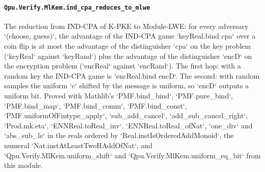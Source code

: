 \documentclass[11pt]{article}
\begin{document}
\paragraph{\texttt{Qpu.Verify.MlKem.ind\_cpa\_reduces\_to\_mlwe}}
The reduction from IND-CPA of K-PKE to Module-LWE: for every adversary `(choose, guess)`, the advantage of the IND-CPA game `keyReal.bind cpa` over a coin flip is at most the advantage of the distinguisher `cpa` on the key problem (`keyReal` against `keyRand`) plus the advantage of the distinguisher `encD` on the encryption problem (`encReal` against `encRand`). The first hop: with a random key the IND-CPA game is `encReal.bind encD`. The second: with random samples the uniform `c` shifted by the message is uniform, so `encD` outputs a uniform bit. Proved with Mathlib's `PMF.bind\_bind`, `PMF.pure\_bind`, `PMF.bind\_map`, `PMF.bind\_comm`, `PMF.bind\_const`, `PMF.uniformOfFintype\_apply`, `sub\_add\_cancel`, `add\_sub\_cancel\_right`, `Prod.mk.eta`, `ENNReal.toReal\_inv`, `ENNReal.toReal\_ofNat`, `one\_div` and `abs\_sub\_le` in the reals ordered by `Real.instIsOrderedAddMonoid`, the numeral `Nat.instAtLeastTwoHAddOfNat`, and `Qpu.Verify.MlKem.uniform\_shift` and `Qpu.Verify.MlKem.uniform\_eq\_bit` from this module.
\end{document}
